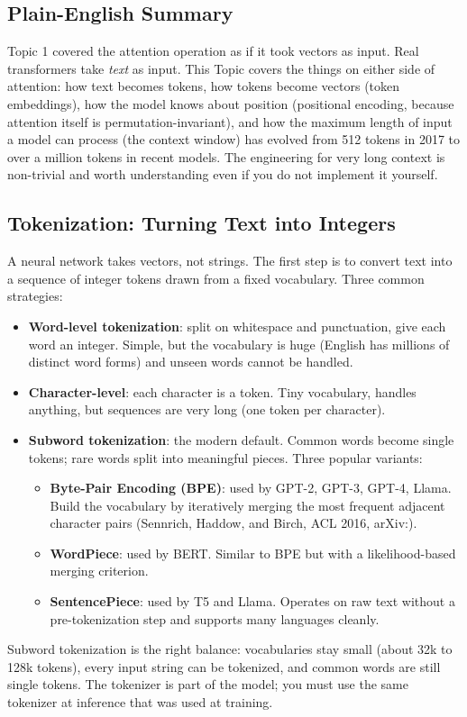 \documentclass[11pt]{article}
\theoremstyle{remark}
\newcommand{\arxiv}[1]{arXiv:\allowbreak #1}
\begin{document}
\subsection{Plain-English Summary}

Topic 1 covered the attention operation as if it took vectors as input. Real transformers take \emph{text} as input. This Topic covers the things on either side of attention: how text becomes tokens, how tokens become vectors (token embeddings), how the model knows about position (positional encoding, because attention itself is permutation-invariant), and how the maximum length of input a model can process (the context window) has evolved from 512 tokens in 2017 to over a million tokens in recent models. The engineering for very long context is non-trivial and worth understanding even if you do not implement it yourself.

\subsection{Tokenization: Turning Text into Integers}

A neural network takes vectors, not strings. The first step is to convert text into a sequence of integer tokens drawn from a fixed vocabulary. Three common strategies:
\begin{itemize}[noitemsep]
    \item \textbf{Word-level tokenization}: split on whitespace and punctuation, give each word an integer. Simple, but the vocabulary is huge (English has millions of distinct word forms) and unseen words cannot be handled.
    \item \textbf{Character-level}: each character is a token. Tiny vocabulary, handles anything, but sequences are very long (one token per character).
    \item \textbf{Subword tokenization}: the modern default. Common words become single tokens; rare words split into meaningful pieces. Three popular variants:
    \begin{itemize}[noitemsep]
        \item \textbf{Byte-Pair Encoding (BPE)}: used by GPT-2, GPT-3, GPT-4, Llama. Build the vocabulary by iteratively merging the most frequent adjacent character pairs (Sennrich, Haddow, and Birch, ACL 2016, \arxiv{1508.07909}).
        \item \textbf{WordPiece}: used by BERT. Similar to BPE but with a likelihood-based merging criterion.
        \item \textbf{SentencePiece}: used by T5 and Llama. Operates on raw text without a pre-tokenization step and supports many languages cleanly.
    \end{itemize}
\end{itemize}
Subword tokenization is the right balance: vocabularies stay small (about 32k to 128k tokens), every input string can be tokenized, and common words are still single tokens. The tokenizer is part of the model; you must use the same tokenizer at inference that was used at training.
\end{document}
